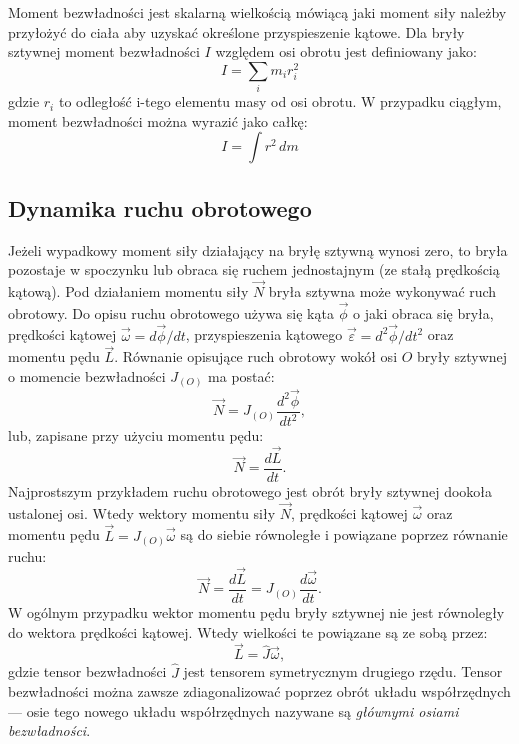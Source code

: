 \documentclass[12pt, a4paper]{article}
\begin{document}
Moment bezwładności jest skalarną wielkością mówiącą jaki moment siły należby przyłożyć do ciała aby uzyskać określone przyspieszenie kątowe. Dla bryły sztywnej moment bezwładności \(I\) względem osi obrotu jest definiowany jako:
\begin{equation}
    I = \sum_{i} m_i r_i^2
\end{equation}
gdzie \(r_i\) to odległość i-tego elementu masy od osi obrotu. W przypadku ciągłym, moment bezwładności można wyrazić jako całkę:
\begin{equation}
    I = \int r^2 \, dm
\end{equation} 

\subsection{Dynamika ruchu obrotowego}

Jeżeli wypadkowy moment siły działający na bryłę sztywną wynosi zero, to bryła pozostaje w spoczynku lub obraca się ruchem jednostajnym (ze stałą prędkością kątową). Pod działaniem momentu siły $\vec{N}$ bryła sztywna może wykonywać ruch obrotowy. Do opisu ruchu obrotowego używa się kąta $\vec{\phi}$ o jaki obraca się bryła, prędkości kątowej $\vec{\omega} = d\vec{\phi}/dt$, przyspieszenia kątowego $\vec{\varepsilon} = d^2\vec{\phi}/dt^2$ oraz momentu pędu $\vec{L}$. Równanie opisujące ruch obrotowy wokół osi $O$ bryły sztywnej o momencie bezwładności $J_{(O)}$ ma postać:
\begin{equation}
    \vec{N} = J_{(O)} \frac{d^2\vec{\phi}}{dt^2},
    \label{eq:rotational_motion}
\end{equation}
lub, zapisane przy użyciu momentu pędu:
\begin{equation}
    \vec{N} = \frac{d\vec{L}}{dt}.
\end{equation}
Najprostszym przykładem ruchu obrotowego jest obrót bryły sztywnej dookoła ustalonej osi. Wtedy wektory momentu siły $\vec{N}$, prędkości kątowej $\vec{\omega}$ oraz momentu pędu $\vec{L} = J_{(O)}\vec{\omega}$ są do siebie równoległe i powiązane poprzez równanie ruchu:
\begin{equation}
    \vec{N} = \frac{d\vec{L}}{dt} = J_{(O)} \frac{d\vec{\omega}}{dt}.
\end{equation}
W ogólnym przypadku wektor momentu pędu bryły sztywnej nie jest równoległy do wektora prędkości kątowej. Wtedy wielkości te powiązane są ze sobą przez:
\begin{equation}
    \vec{L} = \hat{J}\vec{\omega},
\end{equation}
gdzie tensor bezwładności $\hat{J}$ jest tensorem symetrycznym drugiego rzędu. Tensor bezwładności można zawsze zdiagonalizować poprzez obrót układu współrzędnych --- osie tego nowego układu współrzędnych nazywane są \textit{głównymi osiami bezwładności}.
\end{document}

